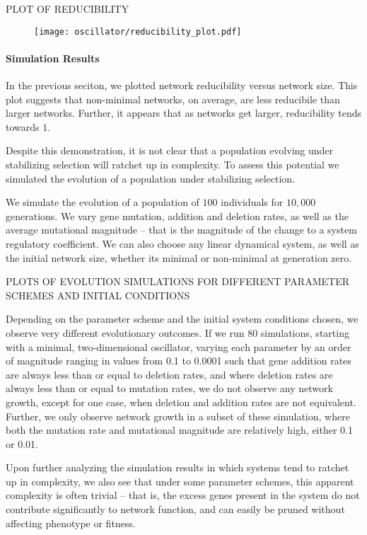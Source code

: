 \documentclass{article}
\newcommand{\1}{\mathbbm{1}}
\begin{document}
PLOT OF REDUCIBILITY

\begin{figure}[H]
\texttt{[image: oscillator/reducibility\_plot.pdf]}
\end{figure}

\paragraph{Simulation Results}

In the previous seciton, we plotted network reducibility versus network size. 
This plot suggests that non-minimal networks, on average, are less reducibile than larger networks.
Further, it appears that as networks get larger, reducibility tends towards $1$. 

Despite this demonstration, it is not clear that a population evolving under stabilizing selection will
ratchet up in complexity. To assess this potential we simulated the evolution of a population under stabilizing selection. 

We simulate the evolution of a population of $100$ individuals for $10,000$ generations. We vary gene mutation, addition and deletion rates,
as well as the average mutational magnitude -- that is the magnitude of the change to a system regulatory coefficient. We can also choose any
linear dynamical system, as well as the initial network size, whether its minimal or non-minimal at generation zero.

PLOTS OF EVOLUTION SIMULATIONS FOR DIFFERENT PARAMETER SCHEMES AND INITIAL CONDITIONS

Depending on the parameter scheme and the initial system conditions chosen, we observe very different evolutionary outcomes. 
If we run 80 simulations, starting with a minimal, two-dimensional oscillator, varying each parameter by an order of magnitude
ranging in values from 0.1 to 0.0001 such that gene addition rates are always less than or equal to deletion rates, and where
deletion rates are always less than or equal to mutation rates, we do not observe any network growth, except for one case, when
deletion and addition rates are not equivalent. Further, we only observe network growth in a subset of these simulation, where
both the mutation rate and mutational magnitude are relatively high, either 0.1 or 0.01.

Upon further analyzing the simulation results in which systems tend to ratchet up in complexity, we also see that under some parameter schemes,
this apparent complexity is often trivial -- that is, the excess genes present in the system do not contribute significantly to network
function, and can easily be pruned without affecting phenotype or fitness. 
\end{document}
